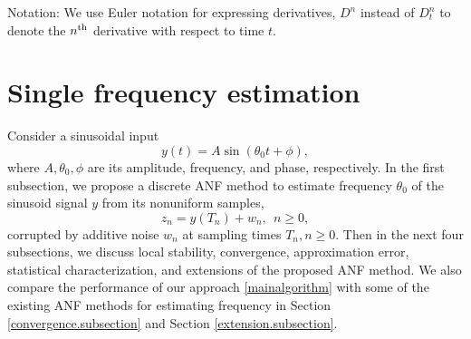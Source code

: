 \documentclass{UCF_ETD}
\begin{document}



Notation: We use Euler notation for expressing derivatives, $D^n$ instead of $D^n_t$ to denote the $n^{\rm th}$ derivative with respect to time $t$.


\section{Single frequency estimation} \label{sec:singlef}
\label{sfe.section}



 Consider a sinusoidal input
 \begin{equation}\label{sinusoid.def}
 y(t) = A \sin(\theta_0 t + \phi),\end{equation}
 where $A, \theta_0, \phi$ are its
amplitude, frequency, and phase, respectively.
In the first subsection, we propose  a discrete ANF method to
estimate frequency $\theta_0$ of the sinusoid  signal  $y$ %
 from its nonuniform samples,
\begin{equation}\label{singularfrequencydata}
z_n=y(T_n)+w_n,\ \  n\ge 0,\end{equation}
 corrupted by additive noise  $w_n$
at sampling times $T_n, n\ge 0$.
Then in the next four subsections, we  discuss local stability,  convergence, approximation error, statistical characterization, and extensions of the proposed  ANF method. 
We also compare the performance of our approach \eqref{mainalgorithm} with some of the existing ANF methods for estimating frequency in Section \ref{convergence.subsection} and Section \ref{extension.subsection}.
\end{document}
